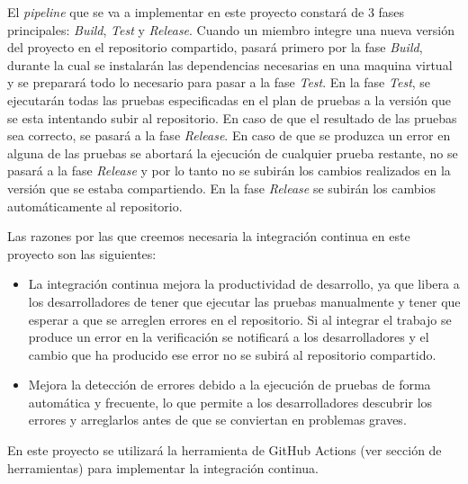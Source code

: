 El \textit{pipeline} que se va a implementar en este proyecto constará de 3 fases principales: \textit{Build}, \textit{Test} y \textit{Release}. Cuando un miembro integre una nueva versión del proyecto en el repositorio compartido, pasará primero por la fase \textit{Build}, durante la cual se instalarán las dependencias necesarias en una maquina virtual y se preparará todo lo necesario para pasar a la fase \textit{Test}. En la fase \textit{Test}, se ejecutarán todas las pruebas especificadas en el plan de pruebas a la versión que se esta intentando subir al repositorio. En caso de que el resultado de las pruebas sea correcto, se pasará a la fase \textit{Release}. En caso de que se produzca un error en alguna de las pruebas se abortará la ejecución de cualquier prueba restante, no se pasará a la fase \textit{Release} y por lo tanto no se subirán los cambios realizados en la versión que se estaba compartiendo. En la fase \textit{Release} se subirán los cambios automáticamente al repositorio.

Las razones por las que creemos necesaria la integración continua en este proyecto son las siguientes:
\begin{itemize}
    \item La integración continua mejora la productividad de desarrollo, ya que libera a los desarrolladores de tener que ejecutar las pruebas manualmente y tener que esperar a que se arreglen errores en el repositorio. Si al integrar el trabajo se produce un error en la verificación se notificará a los desarrolladores y el cambio que ha producido ese error no se subirá al repositorio compartido.
    \item Mejora la detección de errores debido a la ejecución de pruebas de forma automática y frecuente, lo que permite a los desarrolladores descubrir los errores y arreglarlos antes de que se conviertan en problemas graves.
\end{itemize}

En este proyecto se utilizará la herramienta de GitHub Actions (ver sección de herramientas) para implementar la integración continua.
